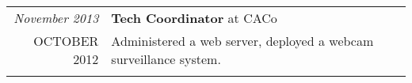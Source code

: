 \documentclass[a4paper,10pt]{article}
\makeatletter
\def\fakesc#1{%
  \begingroup%
  \xdef\fake@name{\csname\curr@fontshape/\f@size\endcsname}%
  \fontsize{\fontdimen8\fake@name}{\baselineskip}\selectfont%
  \uppercase{#1}%
  \endgroup%
}
\renewcommand{\textsc}{\fakesc}
\makeatother
\begin{document}
\begin{tabular}{r|p{11cm}}
  \emph{November 2013} & \textbf{Tech Coordinator} at CACo \\
  \textsc{October 2012} & \footnotesize{Administered a web server, deployed a webcam surveillance system.}\\
  \multicolumn{2}{c}{} \\

\end{tabular}


\end{document}
